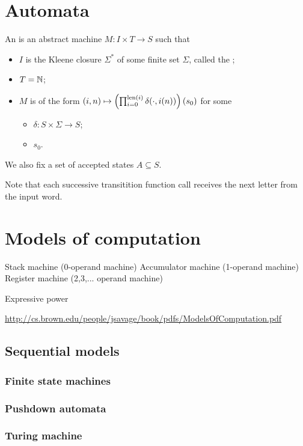 \section{Automata}
\begin{definition}
An  is an abstract machine $M: I\times T \to S$ such that
\begin{itemize}
\item $I$ is the Kleene closure $\Sigma^*$ of some finite set $\Sigma$, called the ;
\item $T = \mathbb{N}$;
\item $M$ is of the form $(i,n)\mapsto \left(\prod_{i=0}^{\operatorname{len}(i)}\delta(\cdot, i(n))\right)(s_0)$ for some
\begin{itemize}
\item {} $\delta: S \times \Sigma \to S$;
\item {} $s_0$.
\end{itemize}
\end{itemize}
We also fix a set of accepted states $A\subseteq S$.
\end{definition}
Note that each successive transitition function call receives the next letter from the input word.

\section{Models of computation}
Stack machine (0-operand machine)
Accumulator machine (1-operand machine)
Register machine (2,3,... operand machine)

Expressive power

\url{http://cs.brown.edu/people/jsavage/book/pdfs/ModelsOfComputation.pdf}

\subsection{Sequential models}
\subsubsection{Finite state machines}
\subsubsection{Pushdown automata}
\subsubsection{Turing machine}
